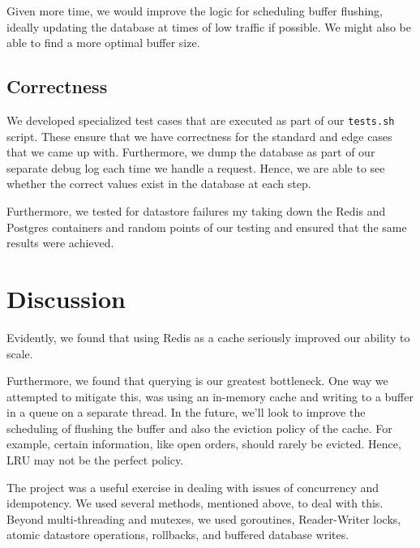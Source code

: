 \documentclass[titlepage, 11pt]{article}
\newcommand\0{\mathbf{0}}
\newcommand\<{\langle}
\renewcommand\>{\rangle}
\begin{document}
Given more time, we would improve the logic for scheduling buffer flushing, ideally updating the database at times of low traffic if possible. We might also be able to find a more optimal buffer size.

\subsection{Correctness}

We developed specialized test cases that are executed as part of our \texttt{tests.sh} script. These ensure that we have correctness for the standard and edge cases that we came up with. Furthermore, we dump the database as part of our separate debug log each time we handle a request. Hence, we are able to see whether the correct values exist in the database at each step.

Furthermore, we tested for datastore failures my taking down the Redis and Postgres containers and random points of our testing and ensured that the same results were achieved.

\section{Discussion}

Evidently, we found that using Redis as a cache seriously improved our ability to scale.

Furthermore, we found that querying is our greatest bottleneck. One way we attempted to mitigate this, was using an in-memory cache and writing to a buffer in a queue on a separate thread. In the future, we'll look to improve the scheduling of flushing the buffer and also the eviction policy of the cache. For example, certain information, like open orders, should rarely be evicted. Hence, LRU may not be the perfect policy.

The project was a useful exercise in dealing with issues of concurrency and idempotency. We used several methods, mentioned above, to deal with this. Beyond  multi-threading and mutexes, we used goroutines, Reader-Writer locks, atomic datastore operations, rollbacks, and buffered database writes.
\end{document}
